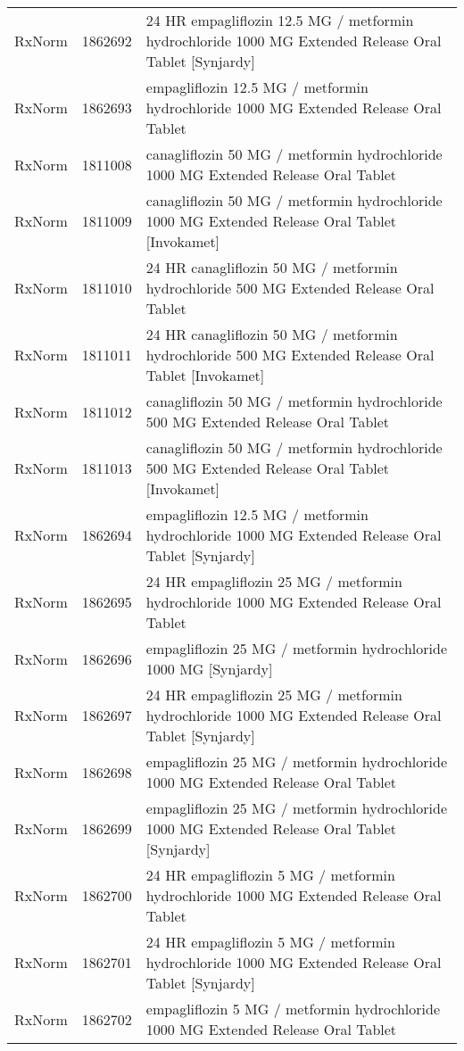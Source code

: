 \begin{longtable}{p{}p{}p{}}
  RxNorm & 1862692 & 24 HR empagliflozin 12.5 MG / metformin hydrochloride 1000 MG Extended Release Oral Tablet [Synjardy] \\ 
  RxNorm & 1862693 & empagliflozin 12.5 MG / metformin hydrochloride 1000 MG Extended Release Oral Tablet \\ 
  RxNorm & 1811008 & canagliflozin 50 MG / metformin hydrochloride 1000 MG Extended Release Oral Tablet \\ 
  RxNorm & 1811009 & canagliflozin 50 MG / metformin hydrochloride 1000 MG Extended Release Oral Tablet [Invokamet] \\ 
  RxNorm & 1811010 & 24 HR canagliflozin 50 MG / metformin hydrochloride 500 MG Extended Release Oral Tablet \\ 
  RxNorm & 1811011 & 24 HR canagliflozin 50 MG / metformin hydrochloride 500 MG Extended Release Oral Tablet [Invokamet] \\ 
  RxNorm & 1811012 & canagliflozin 50 MG / metformin hydrochloride 500 MG Extended Release Oral Tablet \\ 
  RxNorm & 1811013 & canagliflozin 50 MG / metformin hydrochloride 500 MG Extended Release Oral Tablet [Invokamet] \\ 
  RxNorm & 1862694 & empagliflozin 12.5 MG / metformin hydrochloride 1000 MG Extended Release Oral Tablet [Synjardy] \\ 
  RxNorm & 1862695 & 24 HR empagliflozin 25 MG / metformin hydrochloride 1000 MG Extended Release Oral Tablet \\ 
  RxNorm & 1862696 & empagliflozin 25 MG / metformin hydrochloride 1000 MG [Synjardy] \\ 
  RxNorm & 1862697 & 24 HR empagliflozin 25 MG / metformin hydrochloride 1000 MG Extended Release Oral Tablet [Synjardy] \\ 
  RxNorm & 1862698 & empagliflozin 25 MG / metformin hydrochloride 1000 MG Extended Release Oral Tablet \\ 
  RxNorm & 1862699 & empagliflozin 25 MG / metformin hydrochloride 1000 MG Extended Release Oral Tablet [Synjardy] \\ 
  RxNorm & 1862700 & 24 HR empagliflozin 5 MG / metformin hydrochloride 1000 MG Extended Release Oral Tablet \\ 
  RxNorm & 1862701 & 24 HR empagliflozin 5 MG / metformin hydrochloride 1000 MG Extended Release Oral Tablet [Synjardy] \\ 
  RxNorm & 1862702 & empagliflozin 5 MG / metformin hydrochloride 1000 MG Extended Release Oral Tablet \\ 

\end{longtable}
